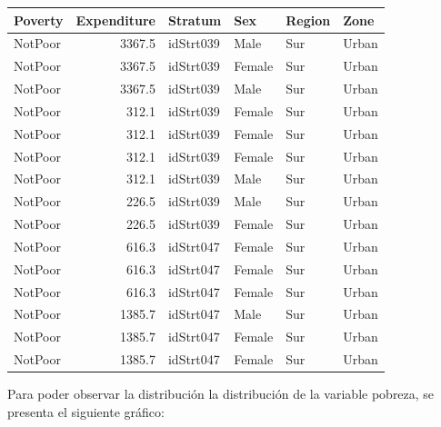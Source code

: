 \documentclass[
  spanish,
  12pt,
]{book}
\begin{document}
\begin{tabular}{l|r|l|l|l|l}
\hline
Poverty & Expenditure & Stratum & Sex & Region & Zone\\
\hline
NotPoor & 3367.5 & idStrt039 & Male & Sur & Urban\\
\hline
NotPoor & 3367.5 & idStrt039 & Female & Sur & Urban\\
\hline
NotPoor & 3367.5 & idStrt039 & Male & Sur & Urban\\
\hline
NotPoor & 312.1 & idStrt039 & Female & Sur & Urban\\
\hline
NotPoor & 312.1 & idStrt039 & Female & Sur & Urban\\
\hline
NotPoor & 312.1 & idStrt039 & Female & Sur & Urban\\
\hline
NotPoor & 312.1 & idStrt039 & Male & Sur & Urban\\
\hline
NotPoor & 226.5 & idStrt039 & Male & Sur & Urban\\
\hline
NotPoor & 226.5 & idStrt039 & Female & Sur & Urban\\
\hline
NotPoor & 616.3 & idStrt047 & Female & Sur & Urban\\
\hline
NotPoor & 616.3 & idStrt047 & Female & Sur & Urban\\
\hline
NotPoor & 616.3 & idStrt047 & Female & Sur & Urban\\
\hline
NotPoor & 1385.7 & idStrt047 & Male & Sur & Urban\\
\hline
NotPoor & 1385.7 & idStrt047 & Female & Sur & Urban\\
\hline
NotPoor & 1385.7 & idStrt047 & Female & Sur & Urban\\
\hline
\end{tabular}

Para poder observar la distribución la distribución de la variable pobreza, se presenta el siguiente gráfico:
\end{document}
